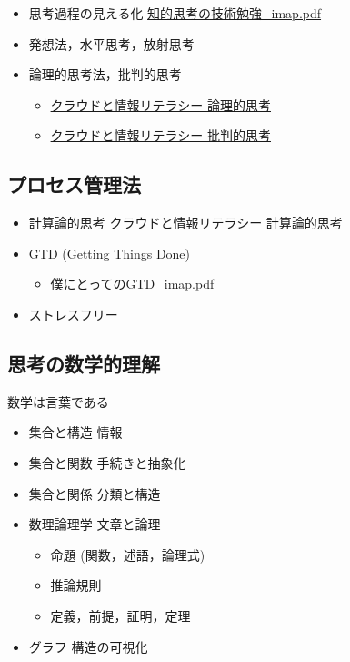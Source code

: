 \documentclass[dvipdfmx,11pat]{jarticle}
\begin{document}
\begin{itemize}
\item 思考過程の見える化 \href{https://masayuki054.github.io/tools\_for\_thinking\_and\_memo/i\_maps/\%E7\%9F\%A5\%E7\%9A\%84\%E6\%80\%9D\%E8\%80\%83\%E3\%81\%AE\%E6\%8A\%80\%E8\%A1\%93\%E5\%8B\%89\%E5\%BC\%B7\_imap.pdf}{知的思考の技術勉強\_imap.pdf}
\item 発想法，水平思考，放射思考
\item 論理的思考法，批判的思考
\begin{itemize}
\item \href{https://masayuki054.github.io/cloud\_and\_information\_literacy/docs/logical-thinking.html}{クラウドと情報リテラシー 論理的思考}
\item \href{https://masayuki054.github.io/cloud\_and\_information\_literacy/docs/critical\_thinking.html}{クラウドと情報リテラシー 批判的思考}
\end{itemize}
\end{itemize}
\subsection{プロセス管理法}
\label{sec:orgc9a7688}
\begin{itemize}
\item 計算論的思考 \href{https://masayuki054.github.io/cloud\_and\_information\_literacy/docs/computational\_thinking.html}{クラウドと情報リテラシー 計算論的思考}
\item GTD (Getting Things Done)
\begin{itemize}
\item \href{https://masayuki054.github.io/cloud\_and\_information\_literacy/i\_maps/\%E5\%83\%95\%E3\%81\%AB\%E3\%81\%A8\%E3\%81\%A3\%E3\%81\%A6\%E3\%81\%AEGTD\_imap.pdf}{僕にとってのGTD\_imap.pdf}
\end{itemize}

\item ストレスフリー
\end{itemize}
\subsection{思考の数学的理解}
\label{sec:org0a681c1}
数学は言葉である
\begin{itemize}
\item 集合と構造 情報
\item 集合と関数 手続きと抽象化
\item 集合と関係 分類と構造
\item 数理論理学 文章と論理
\begin{itemize}
\item 命題 (関数，述語，論理式)
\item 推論規則
\item 定義，前提，証明，定理
\end{itemize}
\item グラフ 構造の可視化
\end{itemize}
\end{document}
